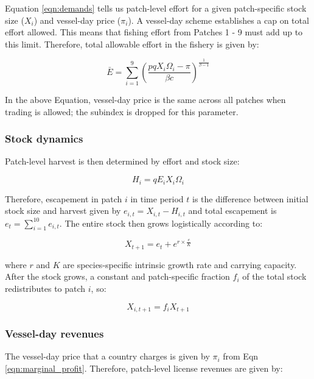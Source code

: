 \documentclass[12pt]{article}
\begin{document}
Equation \ref{eqn:demands} tells us patch-level effort for a given patch-specific stock size ($X_i$) and vessel-day price ($\pi_i$). A vessel-day scheme establishes a cap on total effort allowed. This means that fishing effort from Patches 1 - 9 must add up to this limit. Therefore, total allowable effort in the fishery is given by:

\begin{equation}
\bar{E} = \sum_{i = 1}^9\left(\frac{pqX_i\Omega_i - \pi}{\beta c }\right) ^ {\frac{1}{\beta - 1}}
\label{eqn:Ebar}
\end{equation}

\noindent In the above Equation, vessel-day price is the same across all patches when trading is allowed; the subindex is dropped for this parameter.

\subsubsection{Stock dynamics}

Patch-level harvest is then determined by effort and stock size:

\begin{equation}
H_i = qE_iX_i\Omega_i
\label{eqn:harvest}
\end{equation}


\noindent Therefore, escapement in patch $i$ in time period $t$ is the difference between initial stock size and harvest given by $e_{i,t} = X_{i,t} - H_{i,t}$ and total escapement is $e_t=\sum_{i=1}^{10}e_{i,t}$. The entire stock then grows logistically according to:

\begin{equation}
X_{t+1} = e_t + e^{r \times \frac{e}{K}}
\label{eqn:grow}
\end{equation}

\noindent where $r$ and $K$ are species-specific intrinsic growth rate and carrying capacity. After the stock grows, a constant and patch-specific fraction $f_i$ of the total stock redistributes to patch $i$, so:

\begin{equation}
X_{i,t+1} = f_iX_{t+1}
\label{eqn:disperse}
\end{equation}

\subsubsection{Vessel-day revenues}

The vessel-day price that a country charges is given by $\pi_i$ from Eqn \ref{eqn:marginal_profit}. Therefore, patch-level license revenues are given by:
\end{document}
